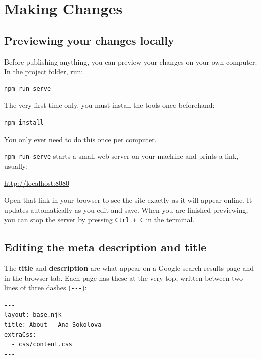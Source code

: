 \documentclass[11pt,a4paper]{article}
\newcommand{\cmd}[1]{\texttt{#1}}
\begin{document}
\section{Making Changes}

\subsection{Previewing your changes locally}

Before publishing anything, you can preview your changes on your own
computer. In the project folder, run:

\begin{lstlisting}[style=shell]
npm run serve
\end{lstlisting}

\begin{notebox}
The very first time only, you must install the tools once beforehand:
\begin{lstlisting}[style=shell]
npm install
\end{lstlisting}
You only ever need to do this once per computer.
\end{notebox}

\noindent \cmd{npm run serve} starts a small web server on your machine
and prints a link, usually:
\begin{center}
\href{http://localhost:8080}{http://localhost:8080}
\end{center}

\noindent Open that link in your browser to see the site exactly as it
will appear online. It updates automatically as you edit and save. When
you are finished previewing, you can stop the server by pressing
\texttt{Ctrl + C} in the terminal.

\subsection{Editing the meta description and title}

The \textbf{title} and \textbf{description} are what appear on a Google
search results page and in the browser tab. Each page has these at the
very top, written between two lines of three dashes (\texttt{-{}-{}-}):

\begin{lstlisting}[style=code, language=yamlfront]
---
layout: base.njk
title: About - Ana Sokolova
extraCss:
  - css/content.css
---
\end{lstlisting}
\end{document}

